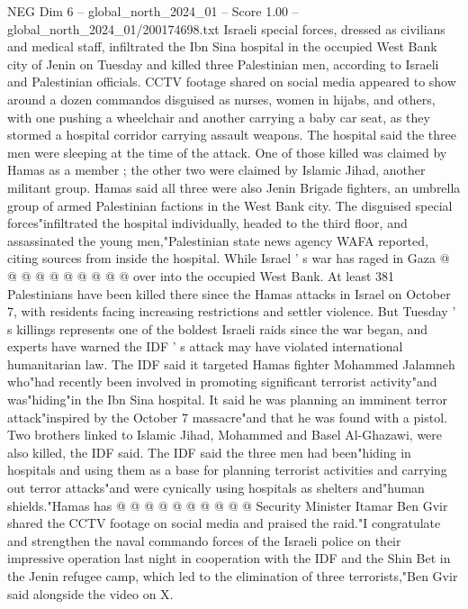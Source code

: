 \begin{textsample}{NEG Dim 6 – global\_north\_2024\_01 – Score 1.00 – global\_north\_2024\_01/200174698.txt}  \label{ex:f6_neg_334}
Israeli special forces, dressed as civilians and medical staff, infiltrated the Ibn Sina hospital in the occupied West Bank city of Jenin on Tuesday and killed three Palestinian men, according to Israeli and Palestinian officials.
CCTV footage shared on social media appeared to show around a dozen commandos disguised as nurses, women in hijabs, and others, with one pushing a wheelchair and another carrying a baby car seat, as they stormed a hospital corridor carrying assault weapons.
The hospital said the three men were sleeping at the time of the attack.
One of those killed was claimed by Hamas as a member ; the other two were claimed by Islamic Jihad, another militant group.
Hamas said all three were also Jenin Brigade fighters, an umbrella group of armed Palestinian factions in the West Bank city.
The disguised special forces"infiltrated the hospital individually, headed to the third floor, and assassinated the young men,"Palestinian state news agency WAFA reported, citing sources from inside the hospital.
While Israel ' s war has raged in Gaza @ @ @ @ @ @ @ @ @ @ over into the occupied West Bank.
At least 381 Palestinians have been killed there since the Hamas attacks in Israel on October 7, with residents facing increasing restrictions and settler violence.
But Tuesday ' s killings represents one of the boldest Israeli raids since the war began, and experts have warned the IDF ' s attack may have violated international humanitarian law.
The IDF said it targeted Hamas fighter Mohammed Jalamneh who"had recently been involved in promoting significant terrorist activity"and was"hiding"in the Ibn Sina hospital.
It said he was planning an imminent terror attack"inspired by the October 7 massacre"and that he was found with a pistol.
Two brothers linked to Islamic Jihad, Mohammed and Basel Al-Ghazawi, were also killed, the IDF said.
The IDF said the three men had been"hiding in hospitals and using them as a base for planning terrorist activities and carrying out terror attacks"and were cynically using hospitals as shelters and"human shields."Hamas has @ @ @ @ @ @ @ @ @ @ Security Minister Itamar Ben Gvir shared the CCTV footage on social media and praised the raid."I congratulate and strengthen the naval commando forces of the Israeli police on their impressive operation last night in cooperation with the IDF and the Shin Bet in the Jenin refugee camp, which led to the elimination of three terrorists,"Ben Gvir said alongside the video on X.

\end{textsample}
